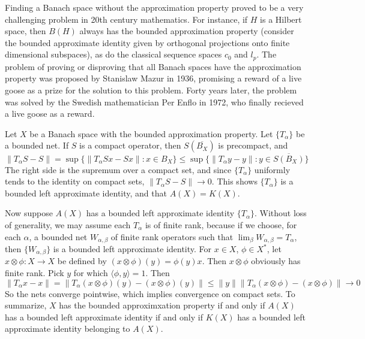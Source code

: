 \begin{example}
    Finding a Banach space without the approximation property proved to be a very challenging problem in 20th century mathematics. For instance, if $H$ is a Hilbert space, then $B(H)$ always has the bounded approximation property (consider the bounded approximate identity given by orthogonal projections onto finite dimensional subspaces), as do the classical sequence spaces $c_0$ and $l_p$. The problem of proving or disproving that all Banach spaces have the approximation property was proposed by Stanislaw Mazur in 1936, promising a reward of a live goose as a prize for the solution to this problem. Forty years later, the problem was solved by the Swedish mathematician Per Enflo in 1972, who finally recieved a live goose as a reward.
\end{example}



\begin{example}
    Let $X$ be a Banach space with the bounded approximation property. Let $\{ T_\alpha \}$ be a bounded net. If $S$ is a compact operator, then $S(\overline{B_X})$ is precompact, and
    \[ \| T_\alpha S - S \| = \sup \{ \| T_\alpha Sx - Sx \| : x \in B_X \} \leq \sup \{ \| T_\alpha y - y \| : y \in \overline{S(B_X)} \} \]
    The right side is the supremum over a compact set, and since $\{ T_\alpha \}$ uniformly tends to the identity on compact sets, $\| T_\alpha S - S \| \to 0$. This shows $\{ T_\alpha \}$ is a bounded left approximate identity, and that $A(X) = K(X)$.

    Now suppose $A(X)$ has a bounded left approximate identity $\{ T_\alpha \}$. Without loss of generality, we may assume each $T_\alpha$ is of finite rank, because if we choose, for each $\alpha$, a bounded net $W_{\alpha, \beta}$ of finite rank operators such that $\lim_\beta W_{\alpha, \beta} = T_\alpha$, then $\{ W_{\alpha, \beta} \}$ is a bounded left approximate identity. For $x \in X$, $\phi \in X^*$, let $x \otimes \phi : X \to X$ be defined by $(x \otimes \phi)(y) = \phi(y) x$. Then $x \otimes \phi$ obviously has finite rank. Pick $y$ for which $\langle \phi, y \rangle = 1$. Then
    \[ \| T_\alpha x - x \| = \| T_\alpha (x \otimes \phi)(y) - (x \otimes \phi)(y) \| \leq \| y \| \| T_\alpha (x \otimes \phi) - (x \otimes \phi) \| \to 0 \]
    So the nets converge pointwise, which implies convergence on compact sets. To summarize, $X$ has the bounded approximxation property if and only if $A(X)$ has a bounded left approximate identity if and only if $K(X)$ has a bounded left approximate identity belonging to $A(X)$.
\end{example}


